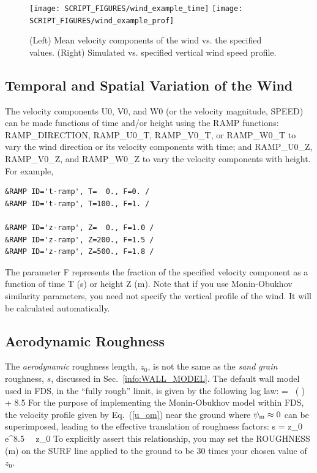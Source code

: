 \documentclass[11pt]{book}
\begin{document}
\begin{figure}[ht]
\texttt{[image: SCRIPT\_FIGURES/wind\_example\_time]}
\texttt{[image: SCRIPT\_FIGURES/wind\_example\_prof]}
\caption[Results of the {\ct wind\_example} test case]{(Left) Mean velocity components of the wind vs. the specified values. (Right) Simulated vs. specified vertical wind speed profile.}
\label{wind_example_fig}
\end{figure}


\subsection{Temporal and Spatial Variation of the Wind}

The velocity components {\ct U0}, {\ct V0}, and {\ct W0} (or the velocity magnitude, {\ct SPEED}) can be made functions of time and/or height using the {\ct RAMP} functions: {\ct RAMP\_DIRECTION}, {\ct RAMP\_U0\_T}, {\ct RAMP\_V0\_T}, or {\ct RAMP\_W0\_T} to vary the wind direction or its velocity components with time; and {\ct RAMP\_U0\_Z}, {\ct RAMP\_V0\_Z}, and {\ct RAMP\_W0\_Z} to vary the velocity components with height. For example,
\begin{lstlisting}
&RAMP ID='t-ramp', T=  0., F=0. /
&RAMP ID='t-ramp', T=100., F=1. /

&RAMP ID='z-ramp', Z=  0., F=1.0 /
&RAMP ID='z-ramp', Z=200., F=1.5 /
&RAMP ID='z-ramp', Z=500., F=1.8 /
\end{lstlisting}
The parameter {\ct F} represents the fraction of the specified velocity component as a function of time {\ct T} (s) or height {\ct Z} (m). Note that if you use Monin-Obukhov similarity parameters, you need not specify the vertical profile of the wind. It will be calculated automatically.

\subsection{Aerodynamic Roughness}
\label{aerodynamic_roughness}

The \emph{aerodynamic} roughness length, $z_0$, is not the same as the \emph{sand grain} roughness, $s$, discussed in Sec.~\ref{info:WALL_MODEL}. The default wall model used in FDS, in the ``fully rough'' limit, is given by the following log law:
\be
    =  \, \ln \left(  \right) + 8.5
\ee
For the purpose of implementing the Monin-Obukhov model within FDS, the velocity profile given by Eq.~(\ref{u_om}) near the ground where $\psi_{\rm m} \approx 0$ can be superimposed, leading to the effective translation of roughness factors:
\be
   s = z_0 \, {\rm e}^{8.5 \, \kappa}  \, z_0
\ee
To explicitly assert this relationship, you may set the {\ct ROUGHNESS} (m) on the {\ct SURF} line applied to the ground to be 30 times your chosen value of $z_0$.
\end{document}
